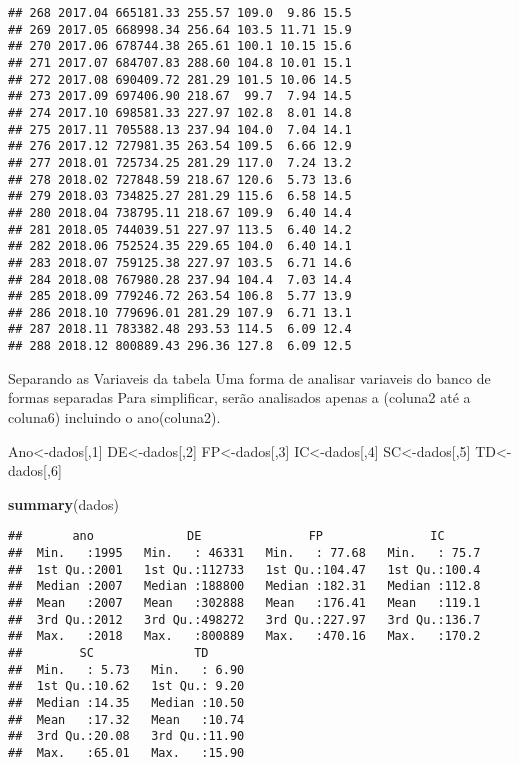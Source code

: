 \documentclass[]{article}
\newenvironment{Shaded}{\begin{snugshade}}{\end{snugshade}}
\newcommand{\DecValTok}[1]{\textcolor[rgb]{0.00,0.00,0.81}{#1}}
\newcommand{\KeywordTok}[1]{\textcolor[rgb]{0.13,0.29,0.53}{\textbf{#1}}}
\newcommand{\NormalTok}[1]{#1}
\begin{document}
\begin{verbatim}
## 268 2017.04 665181.33 255.57 109.0  9.86 15.5
## 269 2017.05 668998.34 256.64 103.5 11.71 15.9
## 270 2017.06 678744.38 265.61 100.1 10.15 15.6
## 271 2017.07 684707.83 288.60 104.8 10.01 15.1
## 272 2017.08 690409.72 281.29 101.5 10.06 14.5
## 273 2017.09 697406.90 218.67  99.7  7.94 14.5
## 274 2017.10 698581.33 227.97 102.8  8.01 14.8
## 275 2017.11 705588.13 237.94 104.0  7.04 14.1
## 276 2017.12 727981.35 263.54 109.5  6.66 12.9
## 277 2018.01 725734.25 281.29 117.0  7.24 13.2
## 278 2018.02 727848.59 218.67 120.6  5.73 13.6
## 279 2018.03 734825.27 281.29 115.6  6.58 14.5
## 280 2018.04 738795.11 218.67 109.9  6.40 14.4
## 281 2018.05 744039.51 227.97 113.5  6.40 14.2
## 282 2018.06 752524.35 229.65 104.0  6.40 14.1
## 283 2018.07 759125.38 227.97 103.5  6.71 14.6
## 284 2018.08 767980.28 237.94 104.4  7.03 14.4
## 285 2018.09 779246.72 263.54 106.8  5.77 13.9
## 286 2018.10 779696.01 281.29 107.9  6.71 13.1
## 287 2018.11 783382.48 293.53 114.5  6.09 12.4
## 288 2018.12 800889.43 296.36 127.8  6.09 12.5
\end{verbatim}

Separando as Variaveis da tabela Uma forma de analisar variaveis do
banco de formas separadas Para simplificar, serão analisados apenas a
(coluna2 até a coluna6) incluindo o ano(coluna2).

\begin{Shaded}
\begin{Highlighting}[]
\NormalTok{Ano<-dados[,}\DecValTok{1}\NormalTok{]}
\NormalTok{DE<-dados[,}\DecValTok{2}\NormalTok{]}
\NormalTok{FP<-dados[,}\DecValTok{3}\NormalTok{]    }
\NormalTok{IC<-dados[,}\DecValTok{4}\NormalTok{]    }
\NormalTok{SC<-dados[,}\DecValTok{5}\NormalTok{]}
\NormalTok{TD<-dados[,}\DecValTok{6}\NormalTok{]}
\end{Highlighting}
\end{Shaded}

\begin{Shaded}
\begin{Highlighting}[]
\KeywordTok{summary}\NormalTok{(dados)}
\end{Highlighting}
\end{Shaded}

\begin{verbatim}
##       ano             DE               FP               IC       
##  Min.   :1995   Min.   : 46331   Min.   : 77.68   Min.   : 75.7  
##  1st Qu.:2001   1st Qu.:112733   1st Qu.:104.47   1st Qu.:100.4  
##  Median :2007   Median :188800   Median :182.31   Median :112.8  
##  Mean   :2007   Mean   :302888   Mean   :176.41   Mean   :119.1  
##  3rd Qu.:2012   3rd Qu.:498272   3rd Qu.:227.97   3rd Qu.:136.7  
##  Max.   :2018   Max.   :800889   Max.   :470.16   Max.   :170.2  
##        SC              TD       
##  Min.   : 5.73   Min.   : 6.90  
##  1st Qu.:10.62   1st Qu.: 9.20  
##  Median :14.35   Median :10.50  
##  Mean   :17.32   Mean   :10.74  
##  3rd Qu.:20.08   3rd Qu.:11.90  
##  Max.   :65.01   Max.   :15.90
\end{verbatim}
\end{document}
